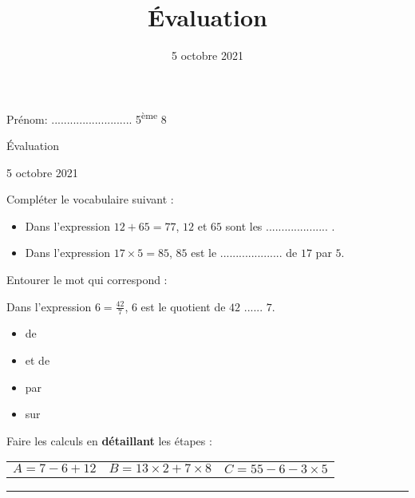 \documentclass[a4paper,11pt]{article}
\title{Évaluation}
\date{5 octobre 2021}
\begin{document}
\begin{minipage}[t][0.45\textheight][t]{\textwidth}
	Prénom: .......................... \hfill 5\textsuperscript{ème} 8
	\begin{center}
		\begin{huge}
			Évaluation
		\end{huge}

		5 octobre 2021
	\end{center}

	\begin{exercice}[(2 points)]
		Compléter le vocabulaire suivant :
		\begin{itemize}
			\item Dans l'expression $12 + 65 = 77$, $12$ et $65$ sont les .................... .
			\item Dans l'expression $17 × 5 = 85$, $85$ est le .................... de $17$ par $5$.
		\end{itemize}

		Entourer le mot qui correspond :

		\begin{center}
			Dans l'expression $6 = \frac{42}{7}$, $6$ est le quotient de $42$ ...... $7$.

			\begin{multicols}{4}
				\begin{itemize}
					\item de
					\item et de
					\item par
					\item sur
				\end{itemize}
			\end{multicols}
		\end{center}
	\end{exercice}

	\begin{exercice}[(6 points)]
		Faire les calculs en \textbf{détaillant} les étapes :

		\begin{tabular}{ccc}
			$A = 7 - 6 + 12$ \hspace{1cm} & $B = 13 × 2 + 7 × 8$ \hspace{1cm} & $C = 55 - 6 - 3 × 5$
		\end{tabular}
		\vspace{1cm}
	\end{exercice}

\end{minipage}

\hrule
\vspace{0.05\textheight}
\end{document}
